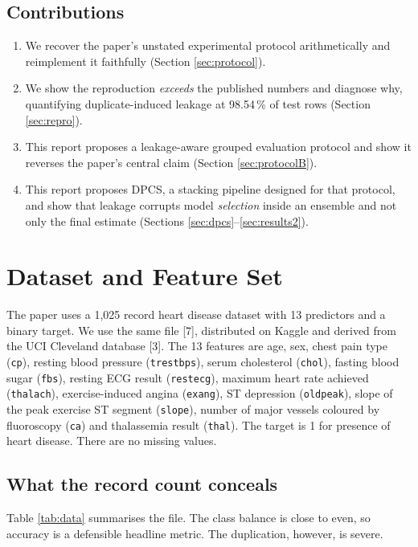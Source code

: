\documentclass[11pt,a4paper]{article}
\begin{document}
\subsection{Contributions}
\begin{enumerate}[leftmargin=*,itemsep=1pt,topsep=2pt]
\item We recover the paper's unstated experimental protocol arithmetically and
      reimplement it faithfully (Section \ref{sec:protocol}).
\item We show the reproduction \emph{exceeds} the published numbers and diagnose
      why, quantifying duplicate-induced leakage at 98.54\,\% of test rows
      (Section \ref{sec:repro}).
\item This report proposes a leakage-aware grouped evaluation protocol and show it reverses
      the paper's central claim (Section \ref{sec:protocolB}).
\item This report proposes DPCS, a stacking pipeline designed for that protocol, and show
      that leakage corrupts model \emph{selection} inside an ensemble and not
      only the final estimate (Sections \ref{sec:dpcs}--\ref{sec:results2}).
\end{enumerate}

\section{Dataset and Feature Set}\label{sec:data}

The paper uses a 1{,}025 record heart disease dataset with 13 predictors and a
binary target. We use the same file [7], distributed on Kaggle and
derived from the UCI Cleveland database [3]. The 13 features are
age, sex, chest pain type (\texttt{cp}), resting blood pressure
(\texttt{trestbps}), serum cholesterol (\texttt{chol}), fasting blood sugar
(\texttt{fbs}), resting ECG result (\texttt{restecg}), maximum heart rate
achieved (\texttt{thalach}), exercise-induced angina (\texttt{exang}),
ST depression (\texttt{oldpeak}), slope of the peak exercise ST segment
(\texttt{slope}), number of major vessels coloured by fluoroscopy (\texttt{ca})
and thalassemia result (\texttt{thal}). The target is 1 for presence of heart
disease. There are no missing values.

\subsection{What the record count conceals}
Table \ref{tab:data} summarises the file. The class balance is close to even, so
accuracy is a defensible headline metric. The duplication, however, is severe.
\end{document}
